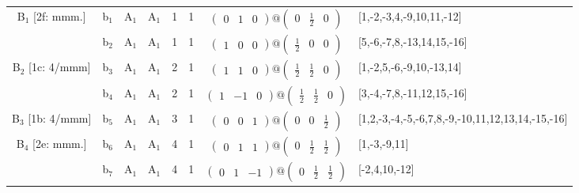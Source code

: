 \documentclass[fleqn,10pt,landscape]{article}
\begin{document}
\begin{itemize}
\begin{center}
\begin{longtable}{cc|cc|c|c|c|l}
B$_{1}$ [2f: mmm.] & b$_{1}$ & A$_{1}$ & A$_{1}$ & 1 & 1 & $\begin{pmatrix} 0 & 1 & 0 \end{pmatrix}@\begin{pmatrix} 0 & \frac{1}{2} & 0 \end{pmatrix}$ & [1,-2,-3,4,-9,10,11,-12] \\
& b$_{2}$ & A$_{1}$ & A$_{1}$ & 1 & 1 & $\begin{pmatrix} 1 & 0 & 0 \end{pmatrix}@\begin{pmatrix} \frac{1}{2} & 0 & 0 \end{pmatrix}$ & [5,-6,-7,8,-13,14,15,-16] \\ \hline
B$_{2}$ [1c: 4/mmm] & b$_{3}$ & A$_{1}$ & A$_{1}$ & 2 & 1 & $\begin{pmatrix} 1 & 1 & 0 \end{pmatrix}@\begin{pmatrix} \frac{1}{2} & \frac{1}{2} & 0 \end{pmatrix}$ & [1,-2,5,-6,-9,10,-13,14] \\
& b$_{4}$ & A$_{1}$ & A$_{1}$ & 2 & 1 & $\begin{pmatrix} 1 & -1 & 0 \end{pmatrix}@\begin{pmatrix} \frac{1}{2} & \frac{1}{2} & 0 \end{pmatrix}$ & [3,-4,-7,8,-11,12,15,-16] \\ \hline
B$_{3}$ [1b: 4/mmm] & b$_{5}$ & A$_{1}$ & A$_{1}$ & 3 & 1 & $\begin{pmatrix} 0 & 0 & 1 \end{pmatrix}@\begin{pmatrix} 0 & 0 & \frac{1}{2} \end{pmatrix}$ & [1,2,-3,-4,-5,-6,7,8,-9,-10,11,12,13,14,-15,-16] \\ \hline
B$_{4}$ [2e: mmm.] & b$_{6}$ & A$_{1}$ & A$_{1}$ & 4 & 1 & $\begin{pmatrix} 0 & 1 & 1 \end{pmatrix}@\begin{pmatrix} 0 & \frac{1}{2} & \frac{1}{2} \end{pmatrix}$ & [1,-3,-9,11] \\
& b$_{7}$ & A$_{1}$ & A$_{1}$ & 4 & 1 & $\begin{pmatrix} 0 & 1 & -1 \end{pmatrix}@\begin{pmatrix} 0 & \frac{1}{2} & \frac{1}{2} \end{pmatrix}$ & [-2,4,10,-12] \\

\end{longtable}
\end{center}
\end{itemize}
\end{document}
